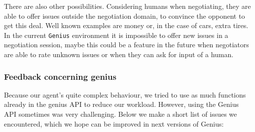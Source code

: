 There are also other possibilities. Considering humans when negotiating, they are able to offer issues outside the negotiation domain, to convince the opponent to get this deal. Well known examples are money or, in the case of cars, extra tires. In the current \texttt{Genius} environment it is impossible to offer new issues in a negotiation session, maybe this could be a feature in the future when negotiators are able to rate unknown issues or when they can ask for input of a human. 

\subsubsection{Feedback concerning genius}

Because our agent's quite complex behaviour, we tried to use as much functions
already in the genius API to reduce our workload. However, using the Genius API 
sometimes was very challenging. Below we make a short list of issues we encountered,
which we hope can be improved in next versions of Genius:


